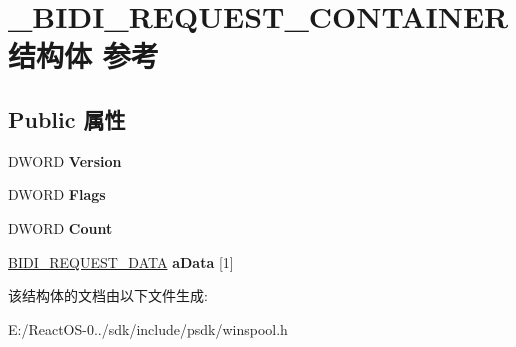 \hypertarget{struct___b_i_d_i___r_e_q_u_e_s_t___c_o_n_t_a_i_n_e_r}{}\section{\+\_\+\+B\+I\+D\+I\+\_\+\+R\+E\+Q\+U\+E\+S\+T\+\_\+\+C\+O\+N\+T\+A\+I\+N\+E\+R结构体 参考}
\label{struct___b_i_d_i___r_e_q_u_e_s_t___c_o_n_t_a_i_n_e_r}
\subsection*{Public 属性}
\begin{DoxyCompactItemize}
\item 
\mbox{\label{struct___b_i_d_i___r_e_q_u_e_s_t___c_o_n_t_a_i_n_e_r_a5a0c57562393a4c9223d93c8ce928d8f}} 
D\+W\+O\+RD {\bfseries Version}
\item 
\mbox{\label{struct___b_i_d_i___r_e_q_u_e_s_t___c_o_n_t_a_i_n_e_r_a96b52e02fcd00fb3f79d9d42177052ca}} 
D\+W\+O\+RD {\bfseries Flags}
\item 
\mbox{\label{struct___b_i_d_i___r_e_q_u_e_s_t___c_o_n_t_a_i_n_e_r_aca2234c9fa65187ad9e20cf5728abb89}} 
D\+W\+O\+RD {\bfseries Count}
\item 
\mbox{\label{struct___b_i_d_i___r_e_q_u_e_s_t___c_o_n_t_a_i_n_e_r_a9d6d1c70216084e215bb01716bb80933}} 
\hyperlink{struct___b_i_d_i___r_e_q_u_e_s_t___d_a_t_a}{B\+I\+D\+I\+\_\+\+R\+E\+Q\+U\+E\+S\+T\+\_\+\+D\+A\+TA} {\bfseries a\+Data} \mbox{[}1\mbox{]}
\end{DoxyCompactItemize}


该结构体的文档由以下文件生成\+:\begin{DoxyCompactItemize}
\item 
E\+:/\+React\+O\+S-\/0../sdk/include/psdk/winspool.\+h\end{DoxyCompactItemize}
